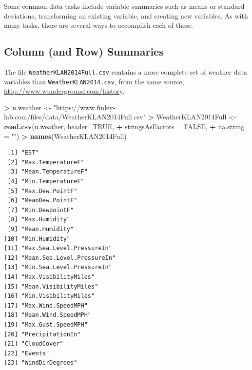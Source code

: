 \documentclass[
]{krantz}
\makeatletter
\newenvironment{Shaded}{\begin{snugshade}}{\end{snugshade}}
\newcommand{\DataTypeTok}[1]{\textcolor[rgb]{0.27,0.27,0.27}{#1}}
\newcommand{\KeywordTok}[1]{\textcolor[rgb]{0.27,0.27,0.27}{\textbf{#1}}}
\newcommand{\NormalTok}[1]{#1}
\newcommand{\OperatorTok}[1]{\textcolor[rgb]{0.43,0.43,0.43}{\textbf{#1}}}
\newcommand{\OtherTok}[1]{\textcolor[rgb]{0.37,0.37,0.37}{#1}}
\newcommand{\StringTok}[1]{\textcolor[rgb]{0.5,0.5,0.5}{#1}}
\newenvironment{kframe}{%
\medskip{}
\setlength{\fboxsep}{.8em}
 \def\at@end@of@kframe{}%
 \ifinner\ifhmode%
  \def\at@end@of@kframe{\end{minipage}}%
  \begin{minipage}{\columnwidth}%
 \fi\fi%
 \def\FrameCommand##1{\hskip\@totalleftmargin \hskip-\fboxsep
 \colorbox{shadecolor}{##1}\hskip-\fboxsep
     \hskip-\linewidth \hskip-\@totalleftmargin \hskip\columnwidth}%
 \MakeFramed {\advance\hsize-\width
   \@totalleftmargin\z@ \linewidth\hsize
   \@setminipage}}%
 {\par\unskip\endMakeFramed%
 \at@end@of@kframe}
\renewenvironment{Shaded}{\begin{kframe}}{\end{kframe}}
\makeatother
\begin{document}
Some common data tasks include variable summaries such as means or standard deviations, transforming an existing variable, and creating new variables. As with many tasks, there are several ways to accomplish each of these.

\hypertarget{column-and-row-summaries}{%
\subsection{Column (and Row) Summaries}\label{column-and-row-summaries}}

The file \texttt{WeatherKLAN2014Full.csv} contains a more complete set of weather data variables than \texttt{WeatherKLAN2014.csv}, from the same source, \url{http://www.wunderground.com/history}.

\begin{Shaded}
\begin{Highlighting}[]
\OperatorTok{\textgreater{}}\StringTok{ }\NormalTok{u.weather \textless{}{-}}\StringTok{ "https://www.finley{-}lab.com/files/data/WeatherKLAN2014Full.csv"}
\OperatorTok{\textgreater{}}\StringTok{ }\NormalTok{WeatherKLAN2014Full \textless{}{-}}\StringTok{ }\KeywordTok{read.csv}\NormalTok{(u.weather, }\DataTypeTok{header=}\OtherTok{TRUE}\NormalTok{, }
\OperatorTok{+}\StringTok{                                }\DataTypeTok{stringsAsFactors =} \OtherTok{FALSE}\NormalTok{, }
\OperatorTok{+}\StringTok{                                }\DataTypeTok{na.string =} \StringTok{""}\NormalTok{)}
\OperatorTok{\textgreater{}}\StringTok{ }\KeywordTok{names}\NormalTok{(WeatherKLAN2014Full)}
\end{Highlighting}
\end{Shaded}

\begin{verbatim}
 [1] "EST"                      
 [2] "Max.TemperatureF"         
 [3] "Mean.TemperatureF"        
 [4] "Min.TemperatureF"         
 [5] "Max.Dew.PointF"           
 [6] "MeanDew.PointF"           
 [7] "Min.DewpointF"            
 [8] "Max.Humidity"             
 [9] "Mean.Humidity"            
[10] "Min.Humidity"             
[11] "Max.Sea.Level.PressureIn" 
[12] "Mean.Sea.Level.PressureIn"
[13] "Min.Sea.Level.PressureIn" 
[14] "Max.VisibilityMiles"      
[15] "Mean.VisibilityMiles"     
[16] "Min.VisibilityMiles"      
[17] "Max.Wind.SpeedMPH"        
[18] "Mean.Wind.SpeedMPH"       
[19] "Max.Gust.SpeedMPH"        
[20] "PrecipitationIn"          
[21] "CloudCover"               
[22] "Events"                   
[23] "WindDirDegrees"           
\end{verbatim}
\end{document}
